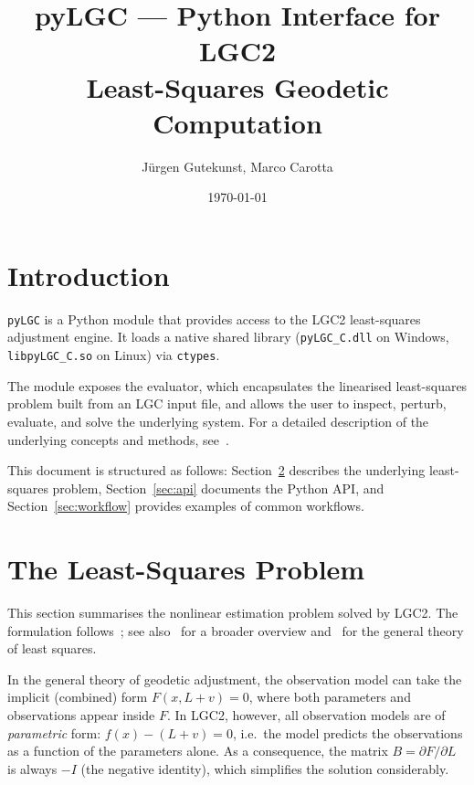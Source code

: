 \documentclass[a4paper,11pt]{article}
\title{\textbf{pyLGC} --- Python Interface for LGC2\\[0.5em]
\large Least-Squares Geodetic Computation}
\author{Jürgen Gutekunst, Marco Carotta}
\date{\today}
\newcommand{\code}[1]{\texttt{#1}}
\begin{document}
\maketitle
\tableofcontents
\newpage

\section{Introduction}

\code{pyLGC} is a Python module that provides access to the LGC2
least-squares adjustment engine. It loads a native shared library
(\code{pyLGC\_C.dll} on Windows, \code{libpyLGC\_C.so} on Linux) via
\code{ctypes}.

The module exposes the evaluator, which encapsulates the linearised
least-squares problem built from an LGC input file, and allows the user
to inspect, perturb, evaluate, and solve the underlying system.
For a detailed description of the underlying concepts and methods,
see~\cite{gutekunst_lgc2}.

This document is structured as follows:
Section~\ref{sec:ls} describes the underlying least-squares problem,
Section~\ref{sec:api} documents the Python API, and
Section~\ref{sec:workflow} provides examples of common workflows.

\section{The Least-Squares Problem}
\label{sec:ls}

This section summarises the nonlinear estimation problem solved by LGC2.
The formulation follows~\cite{barbier_ls}; see
also~\cite{gutekunst_lgc2} for a broader overview
and~\cite{wells_krakiwsky} for the general theory of least squares.

In the general theory of geodetic adjustment, the observation model can
take the implicit (combined) form $F(x, L+v) = 0$, where both
parameters and observations appear inside $F$. In LGC2, however, all
observation models are of \emph{parametric} form: $f(x) - (L+v) = 0$,
i.e.\ the model predicts the observations as a function of the
parameters alone. As a consequence, the matrix
$B = \partial F / \partial L$ is always $-I$ (the negative identity),
which simplifies the solution considerably.
\end{document}
